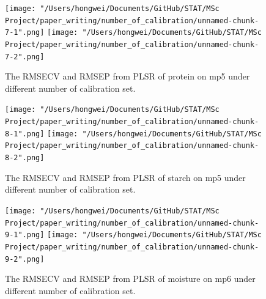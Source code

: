 \documentclass[a4paper,12pt,titlepage]{article} %
\numberwithin{equation}{section}  %
\begin{document}
\begin{appendices}
			\begin{figure}[h]    %
	\centering           %
	\texttt{[image: "/Users/hongwei/Documents/GitHub/STAT/MSc Project/paper\_writing/number\_of\_calibration/unnamed-chunk-7-1".png]}  %
	\texttt{[image: "/Users/hongwei/Documents/GitHub/STAT/MSc Project/paper\_writing/number\_of\_calibration/unnamed-chunk-7-2".png]}  %
	\caption{The RMSECV and RMSEP from PLSR of protein on mp5 under different number of calibration set.}          %
	\label{fig:calibration_7-1}               %
\end{figure}                        %



			\begin{figure}[h]    %
	\centering           %
	\texttt{[image: "/Users/hongwei/Documents/GitHub/STAT/MSc Project/paper\_writing/number\_of\_calibration/unnamed-chunk-8-1".png]}  %
	\texttt{[image: "/Users/hongwei/Documents/GitHub/STAT/MSc Project/paper\_writing/number\_of\_calibration/unnamed-chunk-8-2".png]}  %
	\caption{The RMSECV and RMSEP from PLSR of starch on mp5 under different number of calibration set.}          %
	\label{fig:calibration_8-1}               %
\end{figure}                        %



			\begin{figure}[h]    %
	\centering           %
	\texttt{[image: "/Users/hongwei/Documents/GitHub/STAT/MSc Project/paper\_writing/number\_of\_calibration/unnamed-chunk-9-1".png]}  %
	\texttt{[image: "/Users/hongwei/Documents/GitHub/STAT/MSc Project/paper\_writing/number\_of\_calibration/unnamed-chunk-9-2".png]}  %
	\caption{The RMSECV and RMSEP from PLSR of moisture on mp6 under different number of calibration set.}          %
	\label{fig:calibration_9-1}               %
\end{figure}                        %



\end{appendices}
\end{document}
